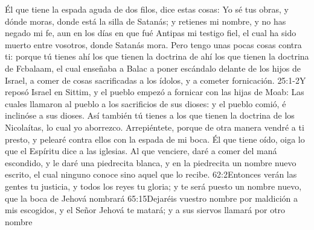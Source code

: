 Él que tiene la espada aguda de dos filos,%
 dice estas cosas:
Yo sé tus obras, y dónde moras,%
 donde está la silla de Satanás; y retienes mi nombre, y no has negado mi fe, aun en los días en que fué Antipas mi testigo fiel, el cual ha sido muerto entre vosotros, donde Satanás mora. %
Pero tengo unas pocas cosas contra ti: porque tú tienes ahí los que tienen la doctrina de ahí los que tienen la doctrina de Fcbalaam, el cual enseñaba a Balac a poner escándalo delante de los hijos de Israel, a comer de cosas sacrificadas a los ídolos, y a cometer fornicación.%
								{25:1-2}{Y reposó Israel en Sittim, y el pueblo empezó a fornicar con las hijas de Moab: Las cuales llamaron al pueblo a los sacrificios de sus dioses: y el pueblo comió, é inclinóse a sus dioses.}
Así también tú tienes a los que tienen la doctrina de los Nicolaítas, lo cual yo aborrezco. %
Arrepiéntete, porque de otra manera vendré a ti presto, y pelearé contra ellos con la espada de mi boca.%
Él que tiene oído, oiga lo que el Espíritu dice a las iglesias. Al que venciere, daré a comer del maná escondido,%
 y le daré una piedrecita blanca, y en la piedrecita un nombre nuevo escrito, el cual ninguno conoce sino aquel que lo recibe.
					{62:2}{Entonces verán las gentes tu justicia, y todos los reyes tu gloria; y te será puesto un nombre nuevo, que la boca de Jehová nombrará}
					{65:15}{Dejaréis vuestro nombre por maldición a mis escogidos, y el Señor Jehová te matará; y a sus siervos llamará por otro nombre}
